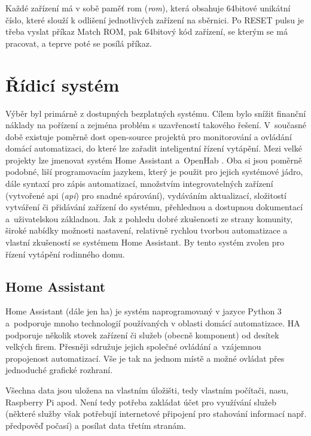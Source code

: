 Každé zařízení má v sobě paměť \acrshort{rom} (\textit{\acrlong{rom}}), která obsahuje 64bitové unikátní číslo, které slouží k odlišení jednotlivých zařízení na sběrnici. Po RESET pulsu je třeba vyslat příkaz Match ROM, pak 64bitový kód zařízení, se kterým se má pracovat, a teprve poté se posílá příkaz. \cite{maly-1-wire-sbernice}

\section{Řídicí systém}

Výběr byl primárně z dostupných bezplatných systému. Cílem bylo snížit finanční náklady na pořízení a zejména problém s uzavřeností takového řešení. V~současné době existuje poměrně dost open-source projektů pro monitorování a ovládání domácí automatizaci, do které lze zařadit inteligentní řízení vytápění. Mezi velké projekty lze jmenovat systém Home Assistant \cite{home-assistant} a~OpenHab \cite{openhab}. Oba si jsou poměrně podobné, liší programovacím jazykem, který je použit pro jejich systémové jádro, dále syntaxí pro zápis automatizací, množstvím integrovatelných zařízení (vytvořené \acrshort{api} (\textit{\acrlong{api}}) pro snadné spárování), vydáváním aktualizací, složitostí vytváření či přidávání zařízení do systému, přehlednou a dostupnou dokumentací a~uživatelskou základnou. Jak z pohledu dobré zkušenosti ze strany komunity, široké nabídky možnosti nastavení, relativně rychlou tvorbou automatizace a vlastní zkušeností se systémem Home Assistant. By tento systém zvolen pro řízení vytápění rodinného domu.

\subsection{Home Assistant}
Home Assistant (dále jen \acrshort{ha}) je systém naprogramovaný v jazyce Python 3 a~podporuje mnoho technologií používaných v oblasti domácí automatizace. HA podporuje několik stovek zařízení či služeb (obecně komponent) od desítek velkých firem. Přesněji sdružuje jejich společné ovládání a~vzájemnou propojenost automatizací. Vše je tak na jednom místě a možné ovládat přes jednoduché grafické rozhraní.

Všechna data jsou uložena na vlastním úložišti, tedy vlastním počítači, nasu, Raspberry Pi apod. Není tedy potřeba zakládat účet pro využívání služeb (některé služby však potřebují internetové připojení pro stahování informací např. předpověď počasí) a posílat data třetím stranám.

